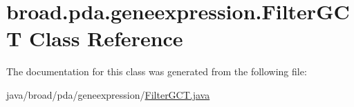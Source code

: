 \hypertarget{classbroad_1_1pda_1_1geneexpression_1_1_filter_g_c_t}{\section{broad.\+pda.\+geneexpression.\+Filter\+G\+C\+T Class Reference}
\label{classbroad_1_1pda_1_1geneexpression_1_1_filter_g_c_t}
}


The documentation for this class was generated from the following file\+:\begin{DoxyCompactItemize}
\item 
java/broad/pda/geneexpression/\hyperlink{_filter_g_c_t_8java}{Filter\+G\+C\+T.\+java}\end{DoxyCompactItemize}
